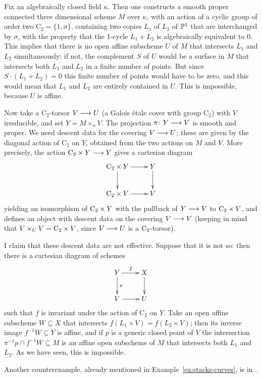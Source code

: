 \begin{4   STACKS}
\begin{4.4 Descent along torsors}
Fix an algebraically closed field $\kappa$. Then one constructs a smooth proper connected three dimensional scheme $M$ over $\kappa$, with an action of a cyclic group of order two $\mathrm{C}_2 = \{1, \sigma\}$, containing two copies $L_1$ of $L_2$ of $\mathbb{P}^1$ that are interchanged by $\sigma$, with the property that the 1-cycle $L_1 + L_2$ is algebraically equivalent to $0$. This implies that there is no open affine subscheme $U$ of $M$ that intersects $L_1$ and $L_2$ simultaneously: if not, the complement $S$ of $U$ would be a surface in $M$ that intersects both $L_1$ and $L_2$ in a finite number of points. But since $S \cdot (L_1 + L_2) = 0$ this finite number of points would have to be zero, and this would mean that $L_1$ and $L_2$ are entirely contained in $U$. This is impossible, because $U$ is affine.

Now take a $\mathrm{C}_2$-torsor $V \arr U$ (a Galois \'etale cover with group $\mathrm{C}_2$) with $V$ irreducible, and set $Y = M \times_\kappa V$. The projection $\pi \colon Y \arr V$ is smooth and proper. We need descent data for the covering $V \arr U$; these are given by the diagonal action of $\mathrm{C}_2$ on $Y$, obtained from the two actions on $M$ and $V$. More precisely, the action $\rC_{2}\times Y \arr Y$ gives a cartesian diagram
   \[
   \xymatrix{
   {}\rC_{2}\times Y \ar[r]\ar[d] & Y\ar[d] \\
   {}\rC_{2}\times V \ar[r]       & V
   }
   \]
yielding an isomorphism of $\mathrm{C}_{2} \times Y$ with the pullback of $Y \arr V$ to $\mathrm{C}_{2}\times V$, and defines an object with descent data on the covering $V \arr V$ (keeping in mind that $V \times_{U} V = \mathrm{C}_{2}\times V$, since $V \arr U$ is a $\mathrm{C}_{2}$-torsor).

I claim that these descent data are not effective. Suppose that it is not so: then there is a cartesian diagram of schemes
   \[
   \xymatrix{
   Y \ar[r]^f \ar[d]^\pi & X\ar[d] \\
   V \ar[r]              & U
   }
   \]
such that $f$ is invariant under the action of $\mathrm{C}_2$ on $Y$. Take an open affine subscheme $W \subseteq X$ that intersects $f(L_1 \times V) = f(L_2 \times V)$; then its inverse image $f ^{-1}W \subseteq Y$ is affine, and if $p$ is a generic closed point of $V$ the intersection $\pi^{-1} p \cap f ^{-1}W \subseteq M$ is an affine open subscheme of $M$ that intersects both $L_1$ and $L_2$. As we have seen, this is impossible.

Another counterexample, already mentioned in Example~\ref{ex:stacks-curves}, is in \cite[XIII 3.2]{raynaudample}.


\end{4.4 Descent along torsors}
\end{4   STACKS}
